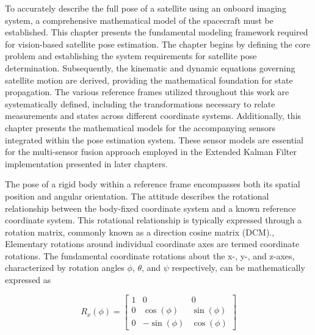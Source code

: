 \label{chap:modelling}

\label{sec:modintro}

To accurately describe the full pose of a satellite using an onboard imaging system, a comprehensive mathematical model 
of the spacecraft must be established. This chapter presents the fundamental modeling framework required for vision-based 
satellite pose estimation. The chapter begins by defining the core problem and establishing the system requirements for satellite 
pose determination. Subsequently, the kinematic and dynamic equations governing satellite motion are derived, providing the mathematical 
foundation for state propagation. The various reference frames utilized throughout this work are systematically 
defined, including the transformations necessary to relate measurements and states across different coordinate systems.
Additionally, this chapter presents the mathematical models for the accompanying sensors integrated within the pose estimation system. 
These sensor models are essential for the multi-sensor fusion approach employed in the Extended Kalman Filter implementation presented in later chapters.




\label{sec:modrigid}

\label{sec:kinematics}

The pose of a rigid body within a reference frame encompasses both its spatial position and angular orientation. The 
attitude describes the rotational relationship between the body-fixed coordinate system and a known reference coordinate system. 
This rotational relationship is typically expressed through a rotation matrix, commonly known as a direction cosine matrix (DCM).\cite{Jongh}\cite{Korf}\cite{Jordaan}\cite{Diebel},
Elementary rotations around individual coordinate axes are termed coordinate rotations. The fundamental coordinate rotations about 
the x-, y-, and z-axes, characterized by rotation angles $\phi$, $\theta$, and $\psi$ respectively, can be mathematically expressed as

\begin{equation}
    R_x(\phi) = \begin{bmatrix} 
        1 & 0 & 0 \\
        0 & \cos(\phi) & \sin(\phi) \\
        0 & -\sin(\phi) & \cos(\phi)
    \end{bmatrix}
    \label{Eq:3.1}
\end{equation}


